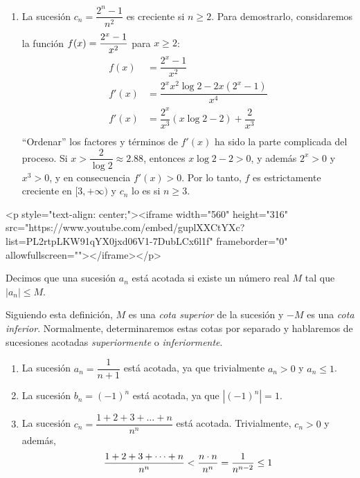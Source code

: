 \begin{ejemplo}
\begin{enumerate}
\item
La sucesión $c_n=\dfrac{2^n-1}{n^2}$ es creciente si $n\ge2$.
Para demostrarlo, considaremos la función $f(x)=\rule{0pt}{2em}\dfrac{2^x-1}{x^2}$ para $x\ge2$:
\begin{align*}
f(x) & =\dfrac{2^x-1}{x^2} \\
f'(x) & =\dfrac{2^xx^2\log 2-2x(2^x-1)}{x^4} \\
f'(x) & =\dfrac{2^x}{x^3}(x\log 2-2) +\dfrac{2}{x^3}\\
\end{align*}
%
``Ordenar'' los factores y términos de $f'(x)$ ha sido la parte complicada del proceso.
Si $x>\dfrac2{\log 2}\approx 2.88$, entonces $x\log 2-2>0$, y además $2^x>0$ y $x^3>0$, y en consecuencia
$f'(x)>0$.
Por lo tanto, $f$ es estrictamente creciente en $[3,+\infty)$ y $c_n$ lo es si $n\ge3$.\fej
\end{enumerate}
\end{ejemplo}
\begin{rawhtml}
<p style="text-align: center;"><iframe width="560" height="316" src="https://www.youtube.com/embed/guplXXCtYXc?list=PL2rtpLKW91qYX0jxd06V1-7DubLCx6l1f" frameborder="0" allowfullscreen=""></iframe></p>
\end{rawhtml}
\begin{definicion} 
Decimos que una sucesión $a_n$ está acotada si existe un número real $M$ tal que $|a_n|\le M$.
\end{definicion}

Siguiendo esta definición, $M$ es una \emph{cota superior} de la sucesión y $-M$ es una \emph{cota inferior}.
Normalmente, determinaremos estas cotas por separado y hablaremos de sucesiones acotadas \emph{superiormente} o \emph{inferiormente}.

\begin{ejemplo-br}
\begin{enumerate}
\item
La sucesión $a_n=\dfrac1{n+1}$ está acotada, ya que trivialmente $a_n>0$ y $a_n\le 1$.

\item
La sucesión $b_n=(-1)^n$ está acotada, ya que $|(-1)^n|=1$.

\item
La sucesión $c_n=\dfrac{1+2+3+\dots+n}{n^n}$ está acotada. Trivialmente, $c_n>0$ y además,
\[
\dfrac{1+2+3+\dots+n}{n^n} < \dfrac{n\cdot n}{n^n} =\dfrac1{n^{n-2}} \le 1
\]
\end{enumerate}
\end{ejemplo-br}

